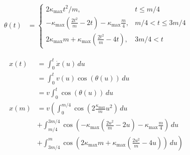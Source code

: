 \documentclass{article}
\begin{document}
\begin{align}
  \theta\left(t\right) &= \left\{
    \begin{array}{cc}
      2\kappa_{\max} t^2 / m,   & t \le m/4\\
      -\kappa_{\max}\left(\frac{2t^{2}}{m}-2t\right) - \kappa_{\max}\frac{m}{4},& m/4 < t \le 3m/4\\
      2\kappa_{\max}m + \kappa_{\max}\left(\frac{2t^{2}}{m}-4t\right), & 3m/4 < t
    \end{array}
  \right.
\end{align}

\begin{align}
  x\left(t\right) &= \int_{0}^{t} \dot{x}\left(u\right)\,du\\
  &= \int_{0}^{t} v\left(u\right)\cos\left(\theta\left(u\right)\right)\,du\\
  &= v \int_{0}^{t} \cos\left(\theta\left(u\right)\right)\,du\\
  x\left(m\right) &= v \left(\int_{0}^{m/4} \cos\left(2\frac{\kappa_{\max}}{m} u^2\right)\,du\right.\\
  &+ \int_{m/4}^{3m/4} \cos\left(-\kappa_{\max}\left(\frac{2u^{2}}{m}-2u\right) - \kappa_{\max}\frac{m}{4}\right)\,du\\
  &+ \left.\int_{3m/4}^{m} \cos\left(2\kappa_{\max}m + \kappa_{\max}\left(\frac{2u^{2}}{m}-4u\right)\right)\,du\right)
\end{align}
\end{document}
